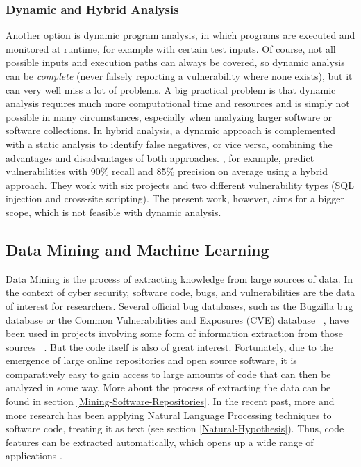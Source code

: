 \documentclass[
	a4paper,
	pagesize,
	pdftex,
	12pt,
	twoside, %
	BCOR=5mm, %
	ngerman,
	fleqn,
	final,
	]{scrartcl}
\begin{document}
\subsubsection{Dynamic and Hybrid Analysis}
Another option is dynamic program analysis, in which programs are executed and monitored at runtime, for example with certain test inputs. Of course, not all possible inputs and execution paths can always be covered, so dynamic analysis can be \textit{complete} (never falsely reporting a vulnerability where none exists), but it can very well miss a lot of problems. A big practical problem is that dynamic analysis requires much more computational time and resources and is simply not possible in many circumstances, especially when analyzing larger software or software collections.
In hybrid analysis, a dynamic approach is complemented with a static analysis to identify false negatives, or vice versa, combining the advantages and disadvantages of both approaches. \cite{Shar.2013}, for example, predict vulnerabilities with 90{\%} recall and 85{\%} precision on average using a hybrid approach. They work with six projects and two different vulnerability types (SQL injection and cross-site scripting). The present work, however, aims for a bigger scope, which is not feasible with dynamic analysis.\\



\subsection{Data Mining and Machine Learning}
Data Mining is the process of extracting knowledge from large sources of data. %
In the context of cyber security, software code, bugs, and vulnerabilities are the data of interest for researchers. Several official bug databases, such as the Bugzilla bug database or the Common Vulnerabilities and Exposures (CVE) database ~\cite{CVE}, have been used in projects involving some form of information extraction from those sources ~\cite{Wijayasekara.2012}. But the code itself is also of great interest. Fortunately, due to the emergence of large online repositories and open source software, it is comparatively easy to gain access to large amounts of code that can then be analyzed in some way. More about the process of extracting the data can be found in section \ref{Mining-Software-Repositories}. In the recent past, more and more research has been applying Natural Language Processing techniques to software code, treating it as text (see section \ref{Natural-Hypothesis}). Thus, code features can be extracted automatically, which opens up a wide range of applications \cite{Dam.2017}.\\
\end{document}
